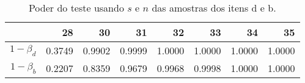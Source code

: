 \begin{table}[ht]
\centering
\caption{Poder do teste usando $s$ e $n$ das amostras dos itens d e b.} 
\label{tb:1d}
\begin{tabular}{rrrrrrrr}
  \toprule
 & 28 & 30 & 31 & 32 & 33 & 34 & 35 \\ 
  \midrule
$1-\beta_d$ & 0.3749 & 0.9902 & 0.9999 & 1.0000 & 1.0000 & 1.0000 & 1.0000 \\ 
  $1-\beta_b$ & 0.2207 & 0.8359 & 0.9679 & 0.9968 & 0.9998 & 1.0000 & 1.0000 \\ 
   \bottomrule
\end{tabular}
\end{table}
